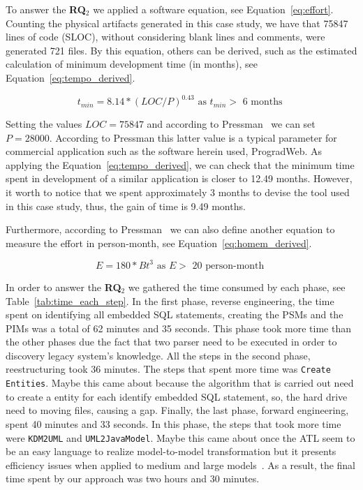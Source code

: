 \documentclass[a4paper,twoside]{article}
\begin{document}
To answer the \textbf{RQ$_2$} we applied a software equation, see Equation~\ref{eq:effort}. Counting the physical artifacts generated in this case study, we have that 75847 lines of code (SLOC), without considering blank lines and comments, were generated 721 files. By this equation, others can be derived, such as the estimated calculation of minimum development time (in months), see Equation~\ref{eq:tempo_derived}.

\begin{equation}
t_{min} = 8.14 * (LOC/P )^{0.43} \text{ as } t_{min} > \text{ 6 months }
\label{eq:tempo_derived}	
\end{equation}


Setting the values $LOC=75847$ and according to Pressman~\cite{Pressman} we can set $P=28000$. According to Pressman this latter value is a typical parameter for commercial application such as the software herein used, ProgradWeb. As applying the Equation~\ref{eq:tempo_derived}, we can check that the minimum time spent in development of a similar application is closer to 12.49 months. However, it worth to notice that we spent approximately 3 months to devise the tool used in this case study, thus, the gain of time is 9.49 months. 

Furthermore, according to Pressman~\cite{Pressman} we can also define another equation to measure the effort in person-month, see Equation~\ref{eq:homem_derived}. 

\begin{equation}
E = 180 * Bt^{3} \text{ as } E > \text{ 20 person-month }
\label{eq:homem_derived}	
\end{equation}

In order to answer the \textbf{RQ$_2$} we gathered the time consumed by each phase, see Table~\ref{tab:time_each_step}. In the first phase, reverse engineering, the time spent on identifying all embedded SQL statements, creating the PSMs and the PIMs was a total of 62 minutes and 35 seconds. This phase took more time than the other phases due the fact that two parser need to be executed in order to discovery legacy system's knowledge. All the steps in the second phase, reestructuring took 36 minutes. The steps that spent more time was \texttt{Create Entities}. Maybe this came about because the algorithm that is carried out need to create a entity for each identify embedded SQL statement, so, the hard drive need to moving files, causing a gap. Finally, the last phase, forward engineering, spent 40 minutes and 33 seconds. In this phase, the steps that took more time were \texttt{KDM2UML} and \texttt{UML2JavaModel}. Maybe this came about once the ATL seem to be an easy language to realize model-to-model transformation but it presents efficiency issues when applied to medium and large models~\cite{ATLlazy}. As a result, the final time spent by our approach was two hours and 30 minutes.
\end{document}
